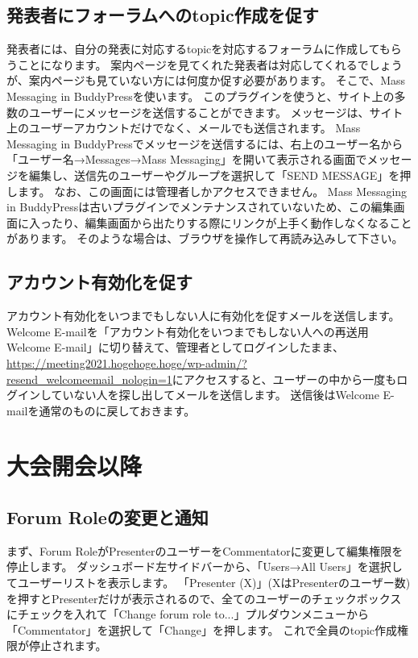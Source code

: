 \documentclass[titlepage,10pt,a4paper,uplatex]{jsbook}
\begin{document}
\subsection{発表者にフォーラムへのtopic作成を促す}

発表者には、自分の発表に対応するtopicを対応するフォーラムに作成してもらうことになります。
案内ページを見てくれた発表者は対応してくれるでしょうが、案内ページも見ていない方には何度か促す必要があります。
そこで、Mass Messaging in BuddyPressを使います。
このプラグインを使うと、サイト上の多数のユーザーにメッセージを送信することができます。
メッセージは、サイト上のユーザーアカウントだけでなく、メールでも送信されます。
Mass Messaging in BuddyPressでメッセージを送信するには、右上のユーザー名から「ユーザー名→Messages→Mass Messaging」を開いて表示される画面でメッセージを編集し、送信先のユーザーやグループを選択して「SEND MESSAGE」を押します。
なお、この画面には管理者しかアクセスできません。
Mass Messaging in BuddyPressは古いプラグインでメンテナンスされていないため、この編集画面に入ったり、編集画面から出たりする際にリンクが上手く動作しなくなることがあります。
そのような場合は、ブラウザを操作して再読み込みして下さい。

\subsection{アカウント有効化を促す}

アカウント有効化をいつまでもしない人に有効化を促すメールを送信します。
Welcome E-mailを「アカウント有効化をいつまでもしない人への再送用Welcome E-mail」に切り替えて、管理者としてログインしたまま、\url{https://meeting2021.hogehoge.hoge/wp-admin/?resend_welcomeemail_nologin=1}にアクセスすると、ユーザーの中から一度もログインしていない人を探し出してメールを送信します。
送信後はWelcome E-mailを通常のものに戻しておきます。

\section{大会開会以降}

\subsection{Forum Roleの変更と通知}

まず、Forum RoleがPresenterのユーザーをCommentatorに変更して編集権限を停止します。
ダッシュボード左サイドバーから、「Users→All Users」を選択してユーザーリストを表示します。
「Presenter (X)」(XはPresenterのユーザー数)を押すとPresenterだけが表示されるので、全てのユーザーのチェックボックスにチェックを入れて「Change forum role to...」プルダウンメニューから「Commentator」を選択して「Change」を押します。
これで全員のtopic作成権限が停止されます。
\end{document}
